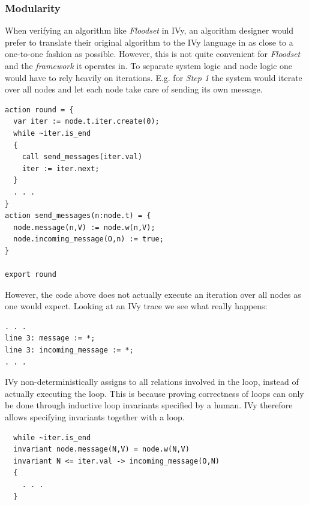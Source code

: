 \documentclass[fleqn]{article}
\begin{document}
\subsubsection{Modularity}
When verifying an algorithm like \textit{Floodset} in IVy, an algorithm designer would prefer to translate their original algorithm to the IVy language in as close to a one-to-one fashion as possible. However, this is not quite convenient for \textit{Floodset} and the \textit{framework} it operates in.
To separate system logic and node logic one would have to rely heavily on iterations. E.g. for \textit{Step 1} the system would iterate over all nodes and let each node take care of sending its own message.

\begin{mdframed}[nobreak=true, backgroundcolor=light-gray, roundcorner=10pt,leftmargin=1, rightmargin=1, innerleftmargin=15, innertopmargin=15,innerbottommargin=15, outerlinewidth=1, linecolor=light-gray]
\begin{lstlisting}
action round = {
  var iter := node.t.iter.create(0);
  while ~iter.is_end
  {
    call send_messages(iter.val)
    iter := iter.next;
  }
  . . .
}
action send_messages(n:node.t) = {
  node.message(n,V) := node.w(n,V);
  node.incoming_message(O,n) := true;
}

export round
\end{lstlisting}
\end{mdframed}

\noindent However, the code above does not actually execute an iteration over all nodes as one would expect. Looking at an IVy trace we see what really happens:

\begin{mdframed}[nobreak=true, backgroundcolor=light-gray, roundcorner=10pt,leftmargin=1, rightmargin=1, innerleftmargin=15, innertopmargin=15,innerbottommargin=15, outerlinewidth=1, linecolor=light-gray]
\begin{lstlisting}
. . .
line 3: message := *;
line 3: incoming_message := *;
. . .
\end{lstlisting}
\end{mdframed}

IVy non-deterministically assigns to all relations involved in the loop, instead of actually executing the loop.  This is because proving correctness of loops can only be done through inductive loop invariants specified by a human. IVy therefore allows specifying invariants together with a loop.
\begin{mdframed}[nobreak=true, backgroundcolor=light-gray, roundcorner=10pt,leftmargin=1, rightmargin=1, innerleftmargin=15, innertopmargin=15,innerbottommargin=15, outerlinewidth=1, linecolor=light-gray]
\begin{lstlisting}
  while ~iter.is_end
  invariant node.message(N,V) = node.w(N,V)
  invariant N <= iter.val -> incoming_message(O,N)
  {
    . . .
  }
\end{lstlisting}
\end{mdframed}
\end{document}
